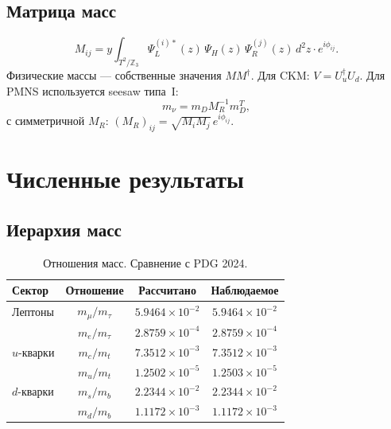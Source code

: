\documentclass[11pt,a4paper]{article}
\numberwithin{equation}{section}
\begin{document}
\subsection{Матрица масс}

\begin{equation}
M_{ij} = y \int_{T^2/\mathbb{Z}_3}
\Psi_L^{(i)*}(z)\,\Psi_H(z)\,\Psi_R^{(j)}(z)\,d^2z
\cdot e^{i\phi_{ij}}.
\end{equation}
Физические массы --- собственные значения
$M M^\dagger$. Для CKM: $V = U_u^\dagger U_d$.
Для PMNS используется seesaw типа~I:
\begin{equation}
m_\nu = m_D M_R^{-1} m_D^T,
\end{equation}
с симметричной $M_R$:
$(M_R)_{ij} = \sqrt{M_i M_j}\,e^{i\phi_{ij}}$.

\section{Численные результаты}

\subsection{Иерархия масс}

\begin{table}[H]
\centering
\caption{Отношения масс. Сравнение с PDG 2024.}
\label{tab:masses}
\begin{tabular}{lccc}
\toprule
Сектор & Отношение & Рассчитано & Наблюдаемое \\
\midrule
Лептоны  & $m_\mu/m_\tau$ & $5.9464 \times 10^{-2}$ & $5.9464 \times 10^{-2}$ \\
         & $m_e/m_\tau$   & $2.8759 \times 10^{-4}$ & $2.8759 \times 10^{-4}$ \\
\midrule
$u$-кварки & $m_c/m_t$   & $7.3512 \times 10^{-3}$ & $7.3512 \times 10^{-3}$ \\
           & $m_u/m_t$   & $1.2502 \times 10^{-5}$ & $1.2503 \times 10^{-5}$ \\
\midrule
$d$-кварки & $m_s/m_b$   & $2.2344 \times 10^{-2}$ & $2.2344 \times 10^{-2}$ \\
           & $m_d/m_b$   & $1.1172 \times 10^{-3}$ & $1.1172 \times 10^{-3}$ \\
\bottomrule
\end{tabular}
\end{table}
\end{document}
